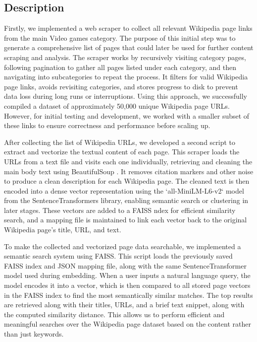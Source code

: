 \documentclass[fleqn,moreauthors,10pt]{ds_report}
\begin{document}
\subsection*{Description}
Firstly, we implemented a web scraper to collect all relevant Wikipedia page links from the main Video games category. The purpose of this initial step was to generate a comprehensive list of pages that could later be used for further content scraping and analysis. The scraper works by recursively visiting category pages, following pagination to gather all pages listed under each category, and then navigating into subcategories to repeat the process. It filters for valid Wikipedia page links, avoids revisiting categories, and stores progress to disk to prevent data loss during long runs or interruptions. Using this approach, we successfully compiled a dataset of approximately 50,000 unique Wikipedia page URLs. However, for initial testing and development, we worked with a smaller subset of these links to ensure correctness and performance before scaling up.

After collecting the list of Wikipedia URLs, we developed a second script to extract and vectorize the textual content of each page. This scraper loads the URLs from a text file and visits each one individually, retrieving and cleaning the main body text using BeautifulSoup \cite{soup}. It removes citation markers and other noise to produce a clean description for each Wikipedia page. The cleaned text is then encoded into a dense vector representation using the `all-MiniLM-L6-v2` model from the SentenceTransformers \cite{sentence} library, enabling semantic search or clustering in later stages. These vectors are added to a FAISS \cite{faiss} ndex for efficient similarity search, and a mapping file is maintained to link each vector back to the original Wikipedia page’s title, URL, and text.

To make the collected and vectorized page data searchable, we implemented a semantic search system using FAISS. This script loads the previously saved FAISS index and JSON mapping file, along with the same SentenceTransformer model used during embedding. When a user inputs a natural language query, the model encodes it into a vector, which is then compared to all stored page vectors in the FAISS index to find the most semantically similar matches. The top results are retrieved along with their titles, URLs, and a brief text snippet, along with the computed similarity distance. This allows us to perform efficient and meaningful searches over the Wikipedia page dataset based on the content rather than just keywords.
\end{document}

